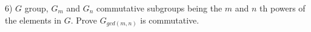 6) $G$ group, $G_{m}$ and $G_{n}$ commutative subgroups being the $m$ and $n$ th powers of the elements in $G$. Prove $G_{gcd(m,n)}$ is commutative.